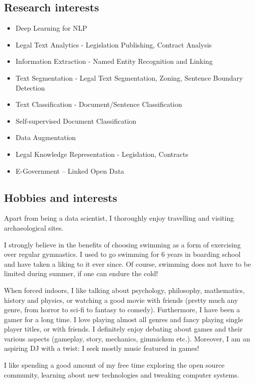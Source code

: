 \documentclass[a4paper,oneside,11pt]{article}
\begin{document}
\subsection*{Research interests}

\begin{itemize}

\item Deep Learning for NLP
\item Legal Text Analytics - Legislation Publishing, Contract Analysis
\item Information Extraction - Named Entity Recognition and Linking
\item Text Segmentation - Legal Text Segmentation, Zoning, Sentence Boundary Detection
\item Text Classification - Document/Sentence Classification
\item Self-supervised Document Classification
\item Data Augmentation
\item Legal Knowledge Representation - Legislation, Contracts
\item E-Government – Linked Open Data

\end{itemize}

\subsection*{Hobbies and interests}

Apart from being a data scientist, I thoroughly enjoy travelling and visiting archaeological sites.

I strongly believe in the benefits of choosing swimming as a form of exercising over regular gymnastics. I used to go swimming for 6 years in boarding school and have taken a liking to it ever since. Of course, swimming does not have to be limited during summer, if one can endure the cold!

When forced indoors, I like talking about psychology, philosophy, mathematics, history and physics, or watching a good movie with friends (pretty much any genre, from horror to sci-fi to fantasy to comedy). Furthermore, I have been a gamer for a long time. I love playing almost all genres and fancy playing single player titles, or with friends. I definitely enjoy debating about games and their various aspects (gameplay, story, mechanics, gimmicksm etc.). Moreover, I am an aspiring DJ with a twist: I seek mostly music featured in games!

I like spending a good amount of my free time exploring the open source community, learning about new technologies and tweaking computer systems.
\end{document}
